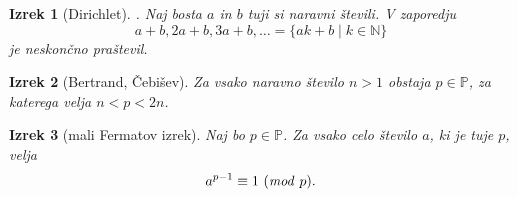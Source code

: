 \documentclass{amsart}
\newcommand{\NN}{\mathbb{N}}
\newcommand{\PP}{\mathbb{P}}
\newtheorem{izrek}{Izrek}[section]
\begin{document}
\begin{izrek}[Dirichlet].
    Naj bosta $a$ in $b$ tuji si naravni števili. V zaporedju 
    \[a+b, 2a+b, 3a+b, \ldots = \{ak +b \mid k \in \NN\}\]
    je neskončno praštevil.
\end{izrek}

\begin{izrek}[Bertrand, Čebišev]
    Za vsako naravno število $n>1$ obstaja $p \in \PP$, za katerega velja $n<p<2n$.
\end{izrek}

\begin{izrek}[mali Fermatov izrek]
    Naj bo $p \in \PP$. Za vsako celo število $a$, ki je tuje $p$, velja
    \[a^{p-1} \equiv 1\ (\text{\emph{mod} } p).\] 
\end{izrek}
\end{document}
